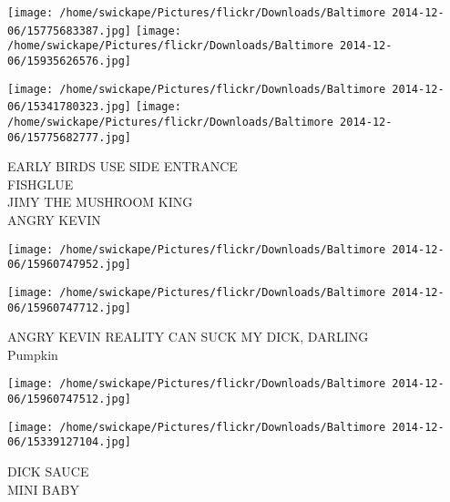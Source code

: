 \documentclass[10pt,letterpaper]{article}
\begin{document}
\texttt{[image: /home/swickape/Pictures/flickr/Downloads/Baltimore 2014-12-06/15775683387.jpg]}
\texttt{[image: /home/swickape/Pictures/flickr/Downloads/Baltimore 2014-12-06/15935626576.jpg]}

\texttt{[image: /home/swickape/Pictures/flickr/Downloads/Baltimore 2014-12-06/15341780323.jpg]}
\texttt{[image: /home/swickape/Pictures/flickr/Downloads/Baltimore 2014-12-06/15775682777.jpg]}

EARLY BIRDS USE SIDE ENTRANCE\\
FISHGLUE\\
JIMY THE MUSHROOM KING\\
ANGRY KEVIN
\pagebreak

\texttt{[image: /home/swickape/Pictures/flickr/Downloads/Baltimore 2014-12-06/15960747952.jpg]}

\vspace{0.25in}
\texttt{[image: /home/swickape/Pictures/flickr/Downloads/Baltimore 2014-12-06/15960747712.jpg]}

ANGRY KEVIN REALITY CAN SUCK MY DICK, DARLING\\
Pumpkin
\pagebreak

\texttt{[image: /home/swickape/Pictures/flickr/Downloads/Baltimore 2014-12-06/15960747512.jpg]}

\vspace{0.25in}
\texttt{[image: /home/swickape/Pictures/flickr/Downloads/Baltimore 2014-12-06/15339127104.jpg]}

DICK SAUCE\\
MINI BABY
\pagebreak
\end{document}
